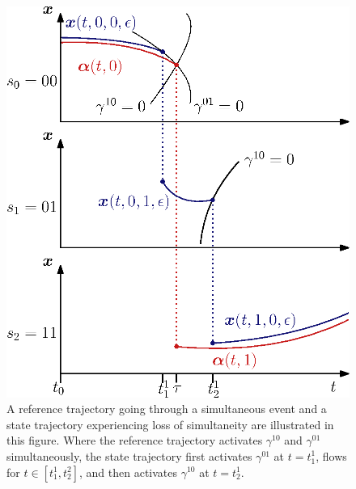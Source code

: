 \documentclass[../DC2017114Bouma.tex]{subfiles}
\begin{document}
\begin{figure}[h]
\centering
\includegraphics[width=.52\textwidth]{simulpert.eps}\caption{A reference trajectory going through a simultaneous event and a state trajectory experiencing loss of simultaneity are illustrated in this figure. Where the reference trajectory activates $\gamma^{10}$ and $\gamma^{01}$ simultaneously, the state trajectory first activates $\gamma^{01}$ at $t=t_1^1$, flows for $t\in [t_1^1,t_2^2]$, and then activates $\gamma^{10}$ at $t=t_2^1$.}\label{fig:4simulpert}
\end{figure}
\end{document}
